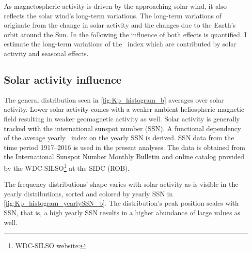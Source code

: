 As magnetospheric activity is driven by the approaching solar wind, it also reflects the solar wind's long-term variations. The long-term variations of \Kp{} originate from the change in solar activity and the changes due to the Earth's orbit around the Sun. In the following the influence of both effects is quantified. I estimate the long-term variations of the \Kp~index which are contributed by solar activity and seasonal effects.

\subsection{Solar activity influence}
The general \Kp{} distribution seen in \autoref{fig:Kp_histogram_b} averages over solar activity. Lower solar activity comes with a weaker ambient heliospheric magnetic field resulting in weaker geomagnetic activity as well. Solar activity is generally tracked with the international sunspot number (SSN). A functional dependency of the average yearly \Kp~index on the yearly SSN is derived. SSN data from the time period 1917--2016 is used in the present analyses. The data is obtained from the International Sunspot Number Monthly Bulletin and online catalog provided by the WDC-SILSO\footnote{WDC-SILSO website: } at the SIDC (ROB).

The \Kp{} frequency distributions' shape varies with solar activity as is visible in the yearly distributions, sorted and colored by yearly SSN in \autoref{fig:Kp_histogram_yearlySSN_b}. The distribution's peak position scales with SSN, that is, a high yearly SSN results in a higher abundance of large \Kp{} values as well.

